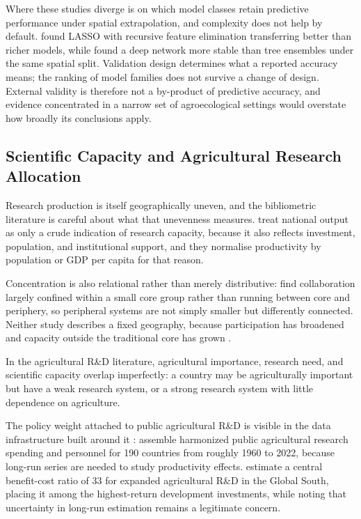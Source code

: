\documentclass[ASNA,twocolumn]{USG}
\begin{document}
Where these studies diverge is on which model classes retain predictive performance under
spatial extrapolation, and complexity does not help by default.
\citet{Habibi2024} found LASSO with recursive feature elimination transferring better than
richer models, while \citet{Okupska2026} found a deep network more stable than tree
ensembles under the same spatial split. Validation design determines what a reported accuracy
means; the ranking of model families does not survive a change of design. External validity is
therefore not a by-product of predictive accuracy, and evidence concentrated in a narrow set
of agroecological settings would overstate how broadly its conclusions apply.

\subsection{Scientific Capacity and Agricultural Research Allocation}

Research production is itself geographically uneven, and the bibliometric literature is
careful about what that unevenness measures. \citet{CashGibson2018} treat national output
as only a crude indication of research capacity, because it also reflects investment,
population, and institutional support, and they normalise productivity by population or GDP
per capita for that reason.

Concentration is also relational rather than merely distributive: \citet{Bueno2025} find
collaboration largely confined within a small core group rather than running between
core and periphery, so peripheral systems are not simply smaller but differently connected.
Neither study describes a fixed geography, because participation has broadened and capacity
outside the traditional core has grown \cite{CashGibson2018}.

In the agricultural R\&D literature, agricultural importance, research need, and scientific
capacity overlap imperfectly: a country may be agriculturally important but have a weak
research system, or a strong research system with little dependence on agriculture.

The policy weight attached to public agricultural R\&D is visible in the data infrastructure
built around it \cite{Fuglie2019}: \citet{vanDijk2025} assemble harmonized public
agricultural research spending and personnel for 190 countries from roughly 1960 to 2022,
because long-run series are needed to study productivity effects.
\citet{Rosegrant2023} estimate a central benefit-cost ratio of 33 for expanded
agricultural R\&D in the Global South, placing it among the highest-return development
investments, while noting that uncertainty in long-run estimation remains a legitimate
concern.
\end{document}
